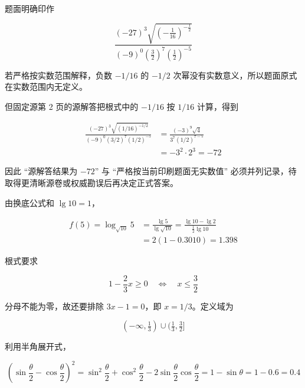 \begin{answer}

题面明确印作

\nopagebreak[4]
\[
\frac{(-27)^3\sqrt{\left(-\frac{1}{16}\right)^{-\frac12}}}
{(-9)^0\left(\frac32\right)^7\left(\frac12\right)^{-5}}
\]

若严格按实数范围解释，负数 $-1/16$ 的 $-1/2$ 次幂没有实数意义，所以题面原式在实数范围内无定义。

但固定源第 2 页的源解答把根式中的 $-1/16$ 按 $1/16$ 计算，得到

\nopagebreak[4]
\[
\begin{aligned}
\frac{(-27)^3\sqrt{(1/16)^{-1/2}}}
{(-9)^0(3/2)^7(1/2)^{-5}}
&=\frac{(-3)^9\sqrt4}{3^7(1/2)^{7-5}}\\
&=-3^2\cdot2^3=-72
\end{aligned}
\]

因此 “源解答结果为 $-72$” 与 “严格按当前印刷题面无实数值” 必须并列记录，待取得更清晰源卷或权威勘误后再决定正式答案。


由换底公式和 $\lg10=1$，

\nopagebreak[4]
\[
\begin{aligned}
f(5)=\log_{\sqrt{10}}5
&=\frac{\lg5}{\lg\sqrt{10}}
=\frac{\lg10-\lg2}{\frac12\lg10}\\
&=2(1-0.3010)=1.398
\end{aligned}
\]


根式要求

\nopagebreak[4]
\[
1-\frac23x\ge0\quad\Longleftrightarrow\quad x\le\frac32
\]

分母不能为零，故还要排除 $3x-1=0$，即 $x=1/3$。定义域为

\nopagebreak[4]
\[
(-\infty,\tfrac13)\cup(\tfrac13,\tfrac32]
\]


利用半角展开式，

\nopagebreak[4]
\[
\left(\sin\frac\theta2-\cos\frac\theta2\right)^2
=\sin^2\frac\theta2+\cos^2\frac\theta2-2\sin\frac\theta2\cos\frac\theta2
=1-\sin\theta=1-0.6=0.4
\]





\gkanswer{答案（5）：$(-\infty,\frac13)\cup(\frac13,\frac32]$。}


\end{answer}
